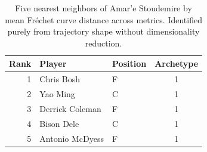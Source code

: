 \begin{table}[htbp]
  \centering\small
  \begin{tabular}{rllc}
    \toprule
    Rank & Player & Position & Archetype \\
    \midrule
    1 & Chris Bosh & F & 1 \\
    2 & Yao Ming & C & 1 \\
    3 & Derrick Coleman & F & 1 \\
    4 & Bison Dele & C & 1 \\
    5 & Antonio McDyess & F & 1 \\
    \bottomrule
  \end{tabular}
  \caption{Five nearest neighbors of Amar'e Stoudemire by mean Fr\'{e}chet curve distance across metrics. Identified purely from trajectory shape without dimensionality reduction.}
  \label{tab:Amar_e_Stoudemire_frechet_curve_neighbors}
\end{table}

